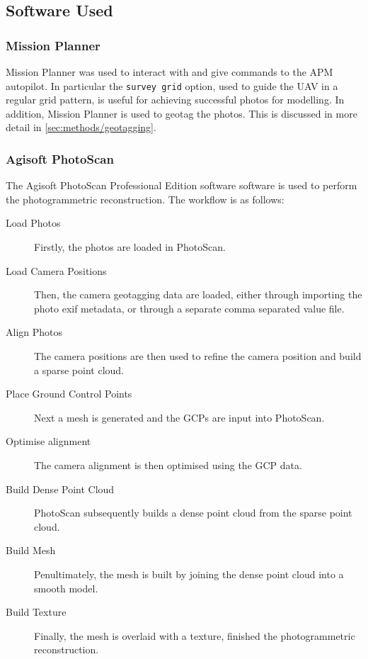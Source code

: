 \subsection{Software Used}

\subsubsection{Mission Planner}

Mission Planner was used to interact with
and give commands to the APM autopilot. In particular the \texttt{survey grid}
option, used to guide the UAV in a regular grid pattern, is useful for achieving
successful photos for modelling. In addition, Mission Planner is used to geotag
the photos. This is discussed in more detail in \ref{sec:methods/geotagging}.

\subsubsection{Agisoft PhotoScan}

The Agisoft PhotoScan Professional Edition
software
software is used to perform the photogrammetric reconstruction. The workflow is
as follows:

\begin{description}
    \item[Load Photos] Firstly, the photos are loaded in PhotoScan.
    \item[Load Camera Positions] Then, the camera geotagging data are loaded,
        either through importing the photo exif metadata, or through a separate
        comma separated value file.
    \item[Align Photos] The camera positions are then used to refine the camera
        position and build a sparse point cloud.
    \item[Place Ground Control Points] Next a mesh is generated and the GCPs are
        input into PhotoScan.
    \item[Optimise alignment] The camera alignment is then optimised using the
        GCP data.
    \item[Build Dense Point Cloud] PhotoScan subsequently builds a dense point
        cloud from the sparse point cloud.
    \item[Build Mesh] Penultimately, the mesh is built by joining the dense
        point cloud into a smooth model.
    \item[Build Texture] Finally, the mesh is overlaid with a texture, finished
        the photogrammetric reconstruction.
\end{description}

